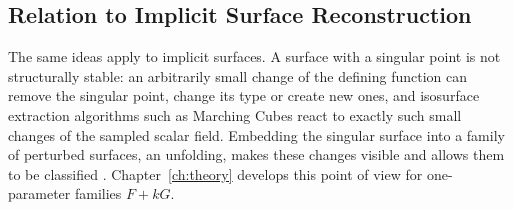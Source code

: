 \documentclass[12pt, a4paper, oneside]{book}
\theoremstyle{plain}
\theoremstyle{definition}
\theoremstyle{remark}
\theoremstyle{definition}
\begin{document}
\subsection{Relation to Implicit Surface Reconstruction}

The same ideas apply to implicit surfaces. A surface with a singular point is not structurally stable: an arbitrarily small change of the defining function can remove the singular point, change its type or create new ones, and isosurface extraction algorithms such as Marching Cubes react to exactly such small changes of the sampled scalar field. Embedding the singular surface into a family of perturbed surfaces, an unfolding, makes these changes visible and allows them to be classified \cite{arnold2012singularities,greuel2007introduction}. Chapter~\ref{ch:theory} develops this point of view for one-parameter families $F+kG$.
\end{document}
